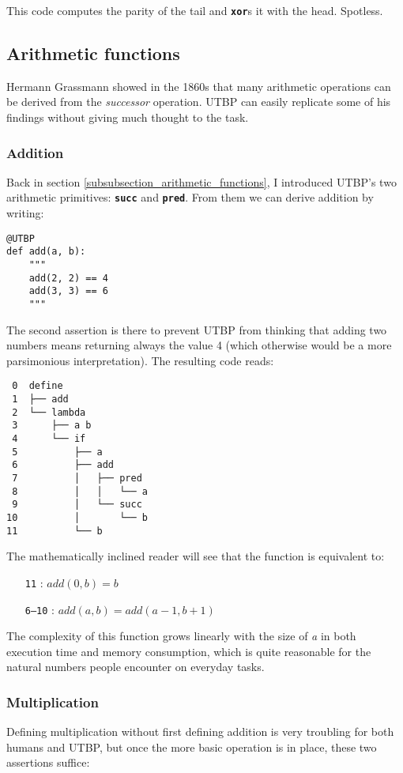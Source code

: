 \documentclass[12pt,twocolumn]{article}
\begin{document}
This code computes the parity of the tail and \texttt{\textbf{xor}}s it with the head. Spotless.

\subsection{Arithmetic functions}
Hermann Grassmann showed in the 1860s that many arithmetic operations can be derived from the \emph{successor} operation. UTBP can easily replicate some of his findings without giving much thought to the task.

\subsubsection{Addition}
Back in section \ref{subsubsection_arithmetic_functions}, I introduced UTBP's two arithmetic primitives: \texttt{\textbf{succ}} and \texttt{\textbf{pred}}. From them we can derive addition by writing:

\begin{verbatim}
@UTBP
def add(a, b):
    """
    add(2, 2) == 4
    add(3, 3) == 6
    """
\end{verbatim}

The second assertion is there to prevent UTBP from thinking that adding two numbers means returning always the value 4 (which otherwise would be a more parsimonious interpretation). The resulting code reads:

\begin{verbatim}
 0  define
 1  ├── add
 2  └── lambda
 3      ├── a b
 4      └── if
 5          ├── a
 6          ├── add
 7          │   ├── pred
 8          │   │   └── a
 9          │   └── succ
10          │       └── b
11          └── b
\end{verbatim}

The mathematically inclined reader will see that the function is equivalent to:
\begin{itemize}
    \item[\texttt{11}]: $add(0, b) = b$
    \item[\texttt{6--10}]: $add(a, b) = add(a-1, b+1)$
\end{itemize}

The complexity of this function grows linearly with the size of \emph{a} in both execution time and memory consumption, which is quite reasonable for the natural numbers people encounter on everyday tasks.

\subsubsection{Multiplication}
Defining multiplication without first defining addition is very troubling for both humans and UTBP, but once the more basic operation is in place, these two assertions suffice:
\end{document}
